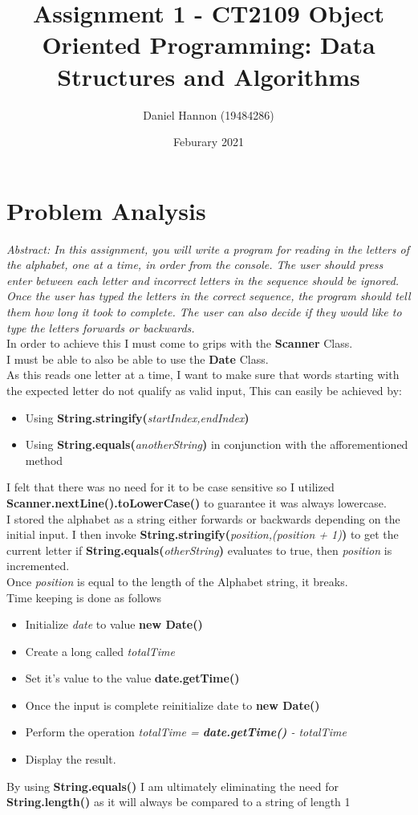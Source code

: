 \documentclass{article}
\title{Assignment 1 - CT2109 Object Oriented Programming: Data Structures and Algorithms}
\author{Daniel Hannon (19484286)}
\date{Feburary 2021}
\begin{document}
	\maketitle
	\section{Problem Analysis}
	\textit{Abstract: In this assignment, you will write a program for reading in the letters of the alphabet, one at a time, in order from the console. The user should press enter between each letter and incorrect letters in the sequence should be ignored. Once the user has typed the letters in the correct sequence, the program should tell them how long it took to complete. The user can also decide if they would like to type the letters forwards or backwards.} \\

	In order to achieve this I must come to grips with the \textbf{Scanner} Class.\\
	I must be able to also be able to use the \textbf{Date} Class.\\
	As this reads one letter at a time, I want to make sure that words starting with the expected letter do not qualify as valid input, This can easily be achieved by:
	\begin{itemize}
		\item Using \textbf{String.stringify(}\textit{startIndex,endIndex}\textbf{)}
		\item Using \textbf{String.equals(}\textit{anotherString}\textbf{)} in conjunction with the afforementioned method
	\end{itemize}
	I felt that there was no need for it to be case sensitive so I utilized \textbf{Scanner.nextLine().toLowerCase()} to guarantee it was always lowercase.
	\\ I stored the alphabet as a string either forwards or backwards depending on the initial input. I then invoke \textbf{String.stringify(}\textit{position,(position + 1)}\textbf{)} to get the current letter if \textbf{String.equals(}\textit{otherString}\textbf{)} evaluates to true, then \textit{position} is incremented.\\
	Once \textit{position} is equal to the length of the Alphabet string, it breaks.
	\\Time keeping is done as follows
	\begin{itemize}
		\item Initialize \textit{date} to value \textbf{new Date()}
		\item Create a long called \textit{totalTime}
		\item Set it's value to the value \textbf{date.getTime()}
		\item Once the input is complete reinitialize date to \textbf{new Date()}
		\item Perform the operation \textit{totalTime = \textbf{date.getTime()} - totalTime}
		\item Display the result.
	\end{itemize}
	By using \textbf{String.equals()} I am ultimately eliminating the need for \textbf{String.length()} as it will always be compared to a string of length 1
	\newpage
\end{document}
